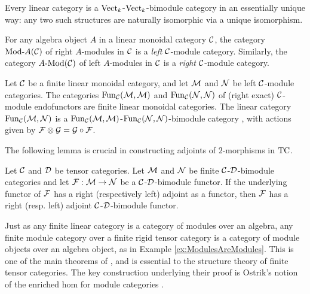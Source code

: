 \documentclass{amsart}
\begin{document}
\begin{example}
	Every linear category is a $\mathrm{Vect}_k$-$\mathrm{Vect}_k$-bimodule category in an essentially unique way: any two such structures are naturally isomorphic via a unique isomorphism.
\end{example} %

\begin{example} \label{ex:ModulesAreModules}
	For any algebra object $A$ in a linear monoidal category $\mathcal C$, the category $\Mod{}{A}(\cC)$ of right $A$-modules in $\mathcal C$ is a \emph{left} $\mathcal C$-module category.  Similarly, the category $\Mod{A}{}(\cC)$ of left $A$-modules in $\mathcal C$ is a \emph{right} $\mathcal C$-module category.
\end{example} %

\begin{example}
	Let $\mathcal C$ be a finite linear monoidal category, and let $\mathcal M$ and $\mathcal N$ be left $\mathcal C$-module categories. The categories $\operatorname{Fun}_{\mathcal C}(\mathcal M, \mathcal M)$ and $\operatorname{Fun}_{\mathcal C}(\mathcal N, \mathcal N)$ of (right exact) $\mathcal C$-module endofunctors are finite linear monoidal categories. The linear category $\operatorname{Fun}_{\mathcal C}(\mathcal M, \mathcal N)$ is a $\operatorname{Fun}_{\mathcal C}(\mathcal M, \mathcal M)$-$\operatorname{Fun}_{\mathcal C}(\mathcal N, \mathcal N)$-bimodule category , with actions given by $\mathcal F \otimes \mathcal G = \mathcal G \circ \mathcal F$. 
\end{example} 

The following lemma is crucial in constructing adjoints of $2$-morphisms in $\mathrm{TC}$.

\begin{lemma} \label{lma:module-adjoint}
Let $\mathcal C$ and $\mathcal D$ be tensor categories. Let  $\mathcal M$ and  $\mathcal N$  be finite $\mathcal C$-$\mathcal D$-bimodule categories and let $\mathcal F: \mathcal M \to \mathcal N$ be a $\mathcal C$-$\mathcal D$-bimodule functor.  If the underlying functor of $\mathcal F$ has a right (respectively left) adjoint as a functor, then $\mathcal F$ has a right (resp. left) adjoint $\mathcal C$-$\mathcal D$-bimodule functor. 
\end{lemma} 


Just as any finite linear category is a category of modules over an algebra, any finite module category over a finite rigid tensor category is a category of module objects over an algebra object, as in Example \ref{ex:ModulesAreModules}.  This is one of the main theorems of \cite{EGNO}, and is essential to the structure theory of finite tensor categories.  The key construction underlying their proof is Ostrik's notion of the enriched hom for module categories \cite{MR1976459}.  
\end{document}
